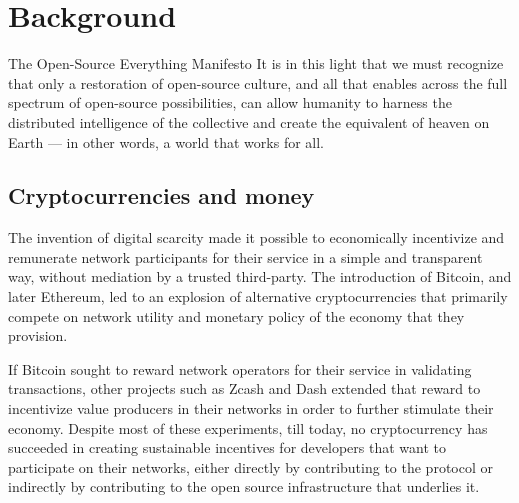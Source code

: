 \section{Background}

\begin{epigraph}{The Open-Source Everything Manifesto}
    \noindent It is in this light that we must recognize that only a restoration of
    open-source culture, and all that enables across the full spectrum of
    open-source possibilities, can allow humanity to harness the distributed
    intelligence of the collective and create the equivalent of heaven on Earth
    --- in other words, a world that works for all.
\end{epigraph}

\subsection{Cryptocurrencies and money}

The invention of digital scarcity made it possible to economically incentivize
and remunerate network participants for their service in a simple and transparent
way, without mediation by a trusted third-party. The introduction of Bitcoin,
and later Ethereum, led to an explosion of alternative cryptocurrencies that
primarily compete on network utility and monetary policy of the economy
that they provision.


If Bitcoin sought to reward network operators for their service in validating
transactions, other projects such as Zcash and Dash extended that reward to
incentivize value producers in their networks in order to further stimulate
their economy. Despite most of these experiments, till today, no cryptocurrency
has succeeded in creating sustainable incentives for developers that want to
participate on their networks, either directly by contributing to the protocol
or indirectly by contributing to the open source infrastructure that underlies
it.

